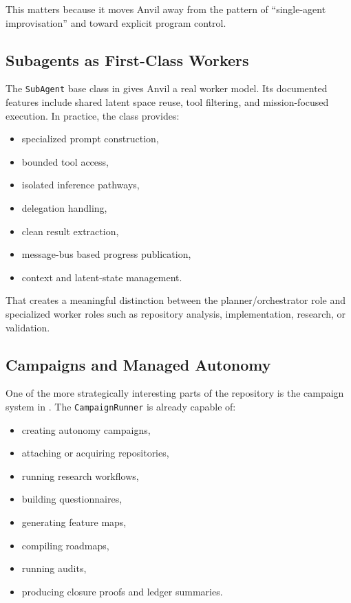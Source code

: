 \documentclass[11pt,a4paper]{article}
\begin{document}
This matters because it moves Anvil away from the pattern of ``single-agent improvisation'' and toward explicit program control.

\subsection{Subagents as First-Class Workers}
The \texttt{SubAgent} base class in  gives Anvil a real worker model. Its documented features include shared latent space reuse, tool filtering, and mission-focused execution. In practice, the class provides:
\begin{itemize}
    \item specialized prompt construction,
    \item bounded tool access,
    \item isolated inference pathways,
    \item delegation handling,
    \item clean result extraction,
    \item message-bus based progress publication,
    \item context and latent-state management.
\end{itemize}

That creates a meaningful distinction between the planner/orchestrator role and specialized worker roles such as repository analysis, implementation, research, or validation.

\subsection{Campaigns and Managed Autonomy}
One of the more strategically interesting parts of the repository is the campaign system in . The \texttt{CampaignRunner} is already capable of:
\begin{itemize}
    \item creating autonomy campaigns,
    \item attaching or acquiring repositories,
    \item running research workflows,
    \item building questionnaires,
    \item generating feature maps,
    \item compiling roadmaps,
    \item running audits,
    \item producing closure proofs and ledger summaries.
\end{itemize}
\end{document}
